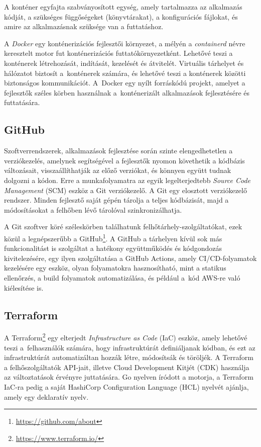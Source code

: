 A konténer egyfajta szabványosított egység, amely tartalmazza az alkalmazás kódját, a szükséges függőségeket (könyvtárakat), a konfigurációs fájlokat, és amire az alkalmazásnak szüksége van a futtatáshoz.

A \emph{Docker} egy konténerizációs fejlesztői környezet, a mélyén a \emph{containerd} névre keresztelt motor fut konténerizációs futtatókörnyezetként.\cite{Docker} Lehetővé teszi a konténerek létrehozását, indítását, kezelését és átvitelét. Virtuális tárhelyet és hálózatot biztosít a~konténerek számára, és lehetővé teszi a konténerek közötti biztonságos kommunikációt. A~Docker egy nyílt forráskódú projekt, amelyet a fejlesztők széles körben használnak a~konténerizált alkalmazások fejlesztésére és futtatására.

\subsection{GitHub}

Szoftverrendszerek, alkalmazások fejlesztése során szinte elengedhetetlen a verziókezelés, amelynek segítségével a fejlesztők nyomon követhetik a kódbázis változásait, visszaállíthatják az előző verziókat, és könnyen együtt tudnak dolgozni a kódon. Erre a munkafolyamatra az egyik legelterjedtebb \emph{Source Code Management} (SCM) eszköz a Git verziókezelő. A Git egy elosztott verziókezelő rendszer. Minden fejlesztő saját gépén tárolja a teljes kódbázisát, majd a módosításokat a felhőben lévő tárolóval szinkronizálhatja.

A Git szoftver köré széleskörben találhatunk felhőtárhely-szolgáltatókat, ezek közül a legnépszerűbb a GitHub\footnote{\url{https://github.com/about}}. A GitHub a tárhelyen kívül sok más funkcionalitást is szolgáltat a hatékony együttműködés és kódgondozás kivitelezésére, egy ilyen szolgáltatása a GitHub Actions, amely CI/CD-folyamatok kezelésére egy eszköz, olyan folyamatokra hasznosítható, mint a statikus ellenőrzés, a build folyamatok automatizálása, és például a~kód AWS-re való kiélesítése is.

\subsection{Terraform}

A Terraform\footnote{\url{https://www.terraform.io/}} egy elterjedt \emph{Infrastructure as Code} (IaC) eszköz\cite{iac}, amely lehetővé teszi a~felhasználók számára, hogy infrastruktúrát definiáljanak kódban, és ezt az infrastruktúrát automatizáltan hozzák létre, módosítsák és töröljék. A Terraform a felhőszolgáltatók API-jait, illetve Cloud Development Kitjét (CDK) használja az változtatások érvényre juttatására. Go nyelven íródott a motorja, a Terraform IaC-ra pedig a saját HashiCorp Configuration Language (HCL) nyelvét ajánlja, amely egy deklaratív nyelv.
